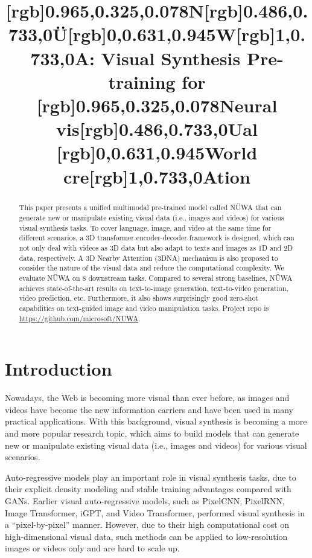 \title{[rgb]{0.965,0.325,0.078}{N}[rgb]{0.486,0.733,0}{Ü}[rgb]{0,0.631,0.945}{W}[rgb]{1,0.733,0}{A}: Visual Synthesis Pre-training for [rgb]{0.965,0.325,0.078}{N}eural vis[rgb]{0.486,0.733,0}{U}al [rgb]{0,0.631,0.945}{W}orld cre[rgb]{1,0.733,0}{A}tion}

\begin{abstract}
This paper presents a unified multimodal pre-trained model called NÜWA that can generate new or manipulate existing visual data (i.e., images and videos) for various visual synthesis tasks. To cover language, image, and video at the same time for different scenarios, a 3D transformer encoder-decoder framework is designed, which can not only deal with videos as 3D data but also adapt to texts and images as 1D and 2D data, respectively. A 3D Nearby Attention (3DNA) mechanism is also proposed to consider the nature of the visual data and reduce the computational complexity. We evaluate NÜWA on 8 downstream tasks. Compared to several strong baselines, NÜWA achieves state-of-the-art results on text-to-image generation, text-to-video generation, video prediction, etc. Furthermore, it also shows surprisingly good zero-shot capabilities on text-guided image and video manipulation tasks. Project repo is \url{https://github.com/microsoft/NUWA}.
\end{abstract}

\section{Introduction}\label{sec:intro}

Nowadays, the Web is becoming more visual than ever before, as images and videos have become the new information carriers and have been used in many practical applications. With this background, visual synthesis is becoming a more and more popular research topic, which aims to build models that can generate new or manipulate existing visual data (i.e., images and videos) for various visual scenarios.

Auto-regressive models\cite{vanoordPixelRecurrentNeural2016,oordConditionalImageGeneration2016,wuGODIVAGeneratingOpenDomaIn2021,rameshZeroShotTexttoImageGeneration2021} play an important role in visual synthesis tasks, due to their explicit density modeling and stable training advantages compared with GANs\cite{brockLargeScaleGAN2019,tulyakovMocoganDecomposingMotion2018,xuAttnganFinegrainedText2018,radfordUnsupervisedRepresentationLearning2015}. Earlier visual auto-regressive models, such as PixelCNN\cite{oordConditionalImageGeneration2016}, PixelRNN\cite{vanoordPixelRecurrentNeural2016}, Image Transformer\cite{parmarImageTransformer2018}, iGPT\cite{chenGenerativepretrainingPixels2020}, and Video Transformer\cite{weissenbornScalingAutoregressiveVideo2020}, performed visual synthesis in a ``pixel-by-pixel'' manner. However, due to their high computational cost on high-dimensional visual data, such methods can be applied to low-resolution images or videos only and are hard to scale up.

